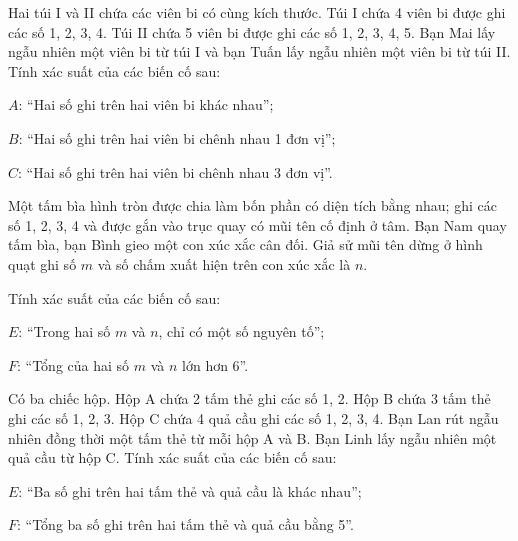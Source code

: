 \begin{practice}
\begin{questions}[resume=SBT]
        \answerline
        \answerline

        \item Hai túi I và II chứa các viên bi có cùng kích thước. Túi I chứa 4 viên bi được ghi các số 1, 2, 3, 4. Túi II chứa 5 viên bi được ghi các số 1, 2, 3, 4, 5. Bạn Mai lấy ngẫu nhiên một viên bi từ túi I và bạn Tuấn lấy ngẫu nhiên một viên bi từ túi II. Tính xác suất của các biến cố sau:
        \begin{questions}
            \item $A$: “Hai số ghi trên hai viên bi khác nhau”;
            \item $B$: “Hai số ghi trên hai viên bi chênh nhau 1 đơn vị”;
            \item $C$: “Hai số ghi trên hai viên bi chênh nhau 3 đơn vị”.
        \end{questions}

        \answerline
        \answerline

        \item Một tấm bìa hình tròn được chia làm bốn phần có diện tích bằng nhau; ghi các số 1, 2, 3, 4 và được gắn vào trục quay có mũi tên cố định ở tâm. Bạn Nam quay tấm bìa, bạn Bình gieo một con xúc xắc cân đối. Giả sử mũi tên dừng ở hình quạt ghi số $m$ và số chấm xuất hiện trên con xúc xắc là $n$.

        Tính xác suất của các biến cố sau:
        \begin{questions}
            \item $E$: “Trong hai số $m$ và $n$, chỉ có một số nguyên tố”;
            \item $F$: “Tổng của hai số $m$ và $n$ lớn hơn 6”.
        \end{questions}

        \answerline
        \answerline

        \item Có ba chiếc hộp. Hộp A chứa 2 tấm thẻ ghi các số 1, 2. Hộp B chứa 3 tấm thẻ ghi các số 1, 2, 3. Hộp C chứa 4 quả cầu ghi các số 1, 2, 3, 4. Bạn Lan rút ngẫu nhiên đồng thời một tấm thẻ từ mỗi hộp A và B. Bạn Linh lấy ngẫu nhiên một quả cầu từ hộp C. Tính xác suất của các biến cố sau:
        \begin{questions}
            \item $E$: “Ba số ghi trên hai tấm thẻ và quả cầu là khác nhau”;
            \item $F$: “Tổng ba số ghi trên hai tấm thẻ và quả cầu bằng 5”.
        \end{questions}

        \answerline
        \answerline
    \end{questions}
\end{practice}
